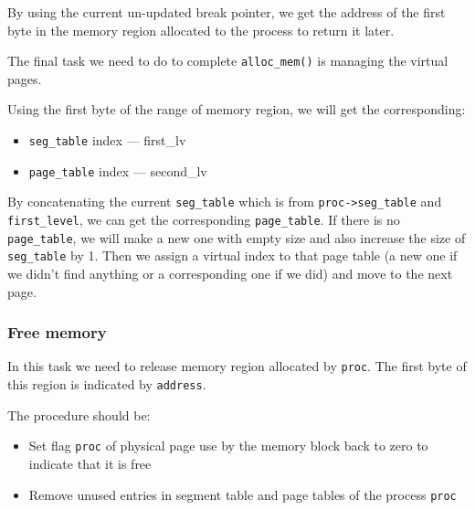 \documentclass[a4paper]{article}
\numberwithin{equation}{section}
\begin{document}
By using the current un-updated break pointer, we get the address of the first byte in the memory region allocated to the process to return it later.


The final task we need to do to complete \texttt{alloc_mem()} is managing the virtual pages.

Using the first byte of the range of memory region, we will get the corresponding: %
\begin{itemize}
  \item  \texttt{seg_table} index --- first\_lv
  \item  \texttt{page_table} index --- second\_lv
\end{itemize}

By concatenating the current  \texttt{seg_table} which is from  \texttt{proc->seg_table} and  \texttt{first_level}, we can get the corresponding  \texttt{page_table}.
If there is no  \texttt{page_table}, we will make a new one with empty size and also increase the size of  \texttt{seg_table} by 1.
Then we assign a virtual index to that page table (a new one if we didn't find anything or a corresponding one if we did) and move to the next page.

\subsubsection{Free memory}
In this task we need to release memory region allocated by  \texttt{proc}.
The first byte of this region is indicated by  \texttt{address}.

The procedure should be:
\begin{itemize}
  \item  Set flag \texttt{proc} of physical page use by the memory block back to zero to indicate that it is free
  \item Remove unused entries in segment table and page tables of the process \texttt{proc}
\end{itemize}
\end{document}
